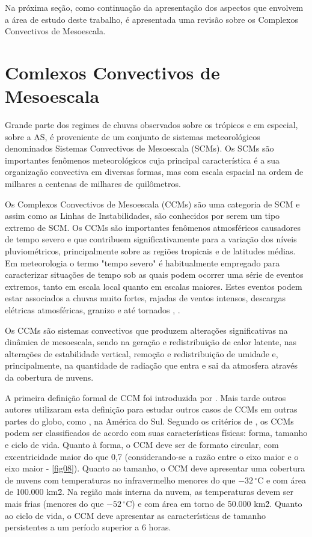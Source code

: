 Na próxima seção, como continuação da apresentação dos aspectos que envolvem a área de estudo deste trabalho, é apresentada uma revisão sobre os Complexos Convectivos de Mesoescala.

\section{Comlexos Convectivos de Mesoescala}
\label{ss:ccm}

Grande parte dos regimes de chuvas observados sobre os trópicos e em especial, sobre a AS, é proveniente de um conjunto de sistemas meteorológicos denominados Sistemas Convectivos de Mesoescala (SCMs). Os SCMs são importantes fenômenos meteorológicos cuja principal característica é a sua organização convectiva em diversas formas, mas com escala espacial na ordem de milhares a centenas de milhares de quilômetros.

Os Complexos Convectivos de Mesoescala (CCMs) são uma categoria de SCM e assim como as Linhas de Instabilidades, são conhecidos por serem um tipo extremo de SCM. Os CCMs são importantes fenômenos atmosféricos causadores de tempo severo e que contribuem significativamente para a variação dos níveis pluviométricos, principalmente sobre as regiões tropicais e de latitudes médias. Em meteorologia o termo "tempo severo" é habitualmente empregado para caracterizar situações de tempo sob as quais podem ocorrer uma série de eventos extremos, tanto em escala local quanto em escalas maiores. Estes eventos podem estar associados a chuvas muito fortes, rajadas de ventos intensos, descargas elétricas atmosféricas, granizo e até tornados \cite{maddox80}, \cite{menezessilvadias04}.

Os CCMs são sistemas convectivos que produzem alterações significativas na dinâmica de mesoescala, sendo na geração e redistribuição de calor latente, nas alterações de estabilidade vertical, remoção e redistribuição de umidade e, principalmente, na quantidade de radiação que entra e sai da atmosfera através da cobertura de nuvens.

A primeira definição formal de CCM foi introduzida por \cite{maddox80}. Mais tarde outros autores utilizaram esta definição para estudar outros casos de CCMs em outras partes do globo, como \cite{velascofritsch87}, na América do Sul. Segundo os critérios de \cite{maddox80}, os CCMs podem ser classificados de acordo com suas características físicas: forma, tamanho e ciclo de vida. Quanto à forma, o CCM deve ser de formato circular, com excentricidade maior do que 0,7 (considerando-se a razão entre o eixo maior e o eixo maior - \autoref{fig08}). Quanto ao tamanho, o CCM deve apresentar uma cobertura de nuvens com temperaturas no infravermelho menores do que $-32\,^{\circ}\mathrm{C}$ e com área de 100.000 km\^{2}. Na região mais interna da nuvem, as temperaturas devem ser mais frias (menores do que $-52\,^{\circ}\mathrm{C}$) e com área em torno de 50.000 km\^{2}. Quanto ao ciclo de vida, o CCM deve apresentar as características de tamanho persistentes a um período superior a 6 horas.

